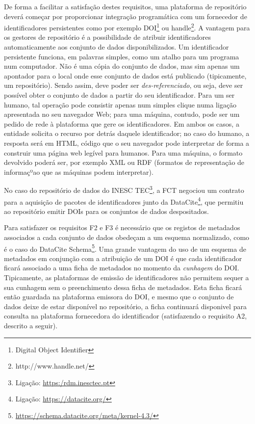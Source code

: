 \documentclass[sigconf,nonacm]{acmart}
\begin{document}
De forma a facilitar a satisfação destes requisitos, uma plataforma de repositório deverá começar por proporcionar integração programática com um fornecedor de identificadores persistentes como por exemplo DOI\footnote{Digital Object Identifier} ou handle\footnote{http://www.handle.net/}. A vantagem para os gestores de repositório é a possibilidade de atribuir identificadores automaticamente aos conjunto de dados disponibilizados. Um identificador persistente funciona, em palavras simples, como um atalho para um programa num computador. Não é uma cópia do conjunto de dados, mas sim apenas um apontador para o local onde esse conjunto de dados está publicado (tipicamente, um repositório). Sendo assim, deve poder ser \emph{des-referenciado}, ou seja, deve ser possível obter o conjunto de dados a partir do seu identificador. Para um ser humano, tal operação pode consistir apenas num simples clique numa ligação apresentada no seu navegador Web; para uma máquina, contudo, pode ser um pedido de rede à plataforma que gere os identificadores. Em ambos os casos, a entidade solicita o recurso por detrás daquele identificador; no caso do humano, a resposta será em HTML, código que o seu navegador pode interpretar de forma a construir  uma página web legível para humanos. Para uma máquina, o formato devolvido poderá ser, por exemplo XML ou RDF (formatos de representação de informaçºao que as máquinas podem interpretar). 

No caso do repositório de dados do INESC TEC\footnote{Ligação: \url{https:/rdm.inesctec.pt}}, a FCT negociou um contrato para a aquisição de pacotes de identificadores junto da DataCite\footnote{Ligação: \url{https://datacite.org/}}, que permitiu ao repositório emitir DOIs para os conjuntos de dados despositados. 

Para satisfazer os requisitos F2 e F3 é necessário que os registos de metadados associados a cada conjunto de dados obedeçam a um esquema normalizado, como é o caso do DataCite Schema\footnote{\url{https://schema.datacite.org/meta/kernel-4.3/}}. Uma grande vantagem do uso de um esquema de metadados em conjunção com a atribuição de um DOI é que cada identificador ficará associado a uma ficha de metadados no momento da \emph{cunhagem} do DOI. Tipicamente, as plataformas de emissão de identificadores não permitem sequer a sua cunhagem sem o preenchimento dessa ficha de metadados. Esta ficha ficará então guardada na plataforma emissora do DOI, e mesmo que o conjunto de dados deixe de estar disponível no repositório, a ficha continuará disponivel para consulta na plataforma fornecedora do identificador (satisfazendo o requisito A2, descrito a seguir).
\end{document}
